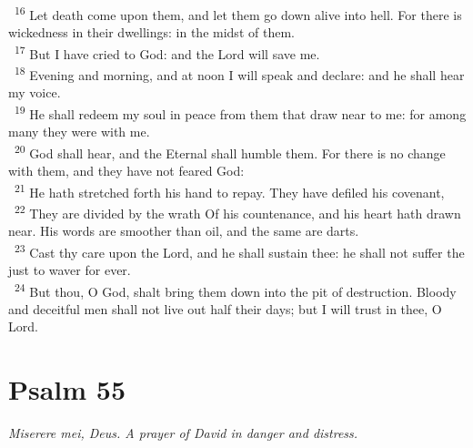 \documentclass[a5paper,12pt]{article}
\begin{document}
\begin{multicols*}{2}
~\textsuperscript{16} Let death come upon them, and let them go down alive into hell. For there is wickedness in their dwellings: in the midst of them.\\
~\textsuperscript{17} But I have cried to God: and the Lord will save me.\\
~\textsuperscript{18} Evening and morning, and at noon I will speak and declare: and he shall hear my voice.\\
~\textsuperscript{19} He shall redeem my soul in peace from them that draw near to me: for among many they were with me.\\
~\textsuperscript{20} God shall hear, and the Eternal shall humble them. For there is no change with them, and they have not feared God:\\
~\textsuperscript{21} He hath stretched forth his hand to repay. They have defiled his covenant,\\
~\textsuperscript{22} They are divided by the wrath Of his countenance, and his heart hath drawn near. His words are smoother than oil, and the same are darts.\\
~\textsuperscript{23} Cast thy care upon the Lord, and he shall sustain thee: he shall not suffer the just to waver for ever.\\
~\textsuperscript{24} But thou, O God, shalt bring them down into the pit of destruction. Bloody and deceitful men shall not live out half their days; but I will trust in thee, O Lord.\\

\section{Psalm 55}
\label{sec:org7dc6e79}
\emph{Miserere mei, Deus. A prayer of David in danger and distress.}\\


\end{multicols*}
\end{document}
